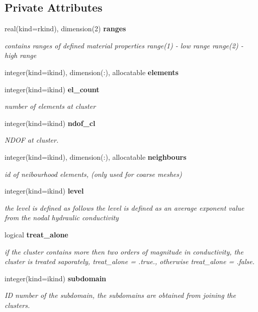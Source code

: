 \subsection*{Private Attributes}
\begin{DoxyCompactItemize}
\item 
real(kind=rkind), dimension(2) {\bf ranges}
\begin{DoxyCompactList}\small\item\em contains ranges of defined material properties range(1) -\/ low range range(2) -\/ high range \end{DoxyCompactList}\item 
integer(kind=ikind), dimension(\+:), allocatable {\bf elements}
\item 
integer(kind=ikind) {\bf el\+\_\+count}
\begin{DoxyCompactList}\small\item\em number of elements at cluster \end{DoxyCompactList}\item 
integer(kind=ikind) {\bf ndof\+\_\+cl}
\begin{DoxyCompactList}\small\item\em N\+D\+OF at cluster. \end{DoxyCompactList}\item 
integer(kind=ikind), dimension(\+:), allocatable {\bf neighbours}
\begin{DoxyCompactList}\small\item\em id of neibourhood elements, (only used for coarse meshes) \end{DoxyCompactList}\item 
integer(kind=ikind) {\bf level}
\begin{DoxyCompactList}\small\item\em the level is defined as follows the level is defined as an average exponent value from the nodal hydraulic conductivity \end{DoxyCompactList}\item 
logical {\bf treat\+\_\+alone}
\begin{DoxyCompactList}\small\item\em if the cluster contains more then two orders of magnitude in conductivity, the cluster is treated saporately, treat\+\_\+alone = .true., otherwise treat\+\_\+alone = .false. \end{DoxyCompactList}\item 
integer(kind=ikind) {\bf subdomain}
\begin{DoxyCompactList}\small\item\em ID number of the subdomain, the subdomains are obtained from joining the clusters. \end{DoxyCompactList}\item 

\end{DoxyCompactItemize}
